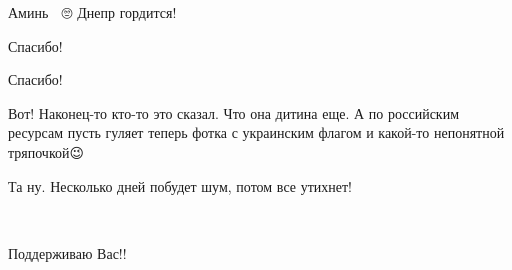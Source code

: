 \begin{itemize}
Аминь 🙌 🙄
Днепр гордится!

 
Спасибо!

 
Спасибо!

 

Вот! Наконец-то кто-то это сказал. Что она дитина еще. А по российским ресурсам
пусть гуляет теперь фотка с украинским флагом и какой-то непонятной тряпочкой😉


 
Та ну. Несколько дней побудет шум, потом все утихнет!

 
👍🏼👍🏼👍🏼👍🏼👍🏼

 
Поддерживаю Вас!!

 

\end{itemize}
